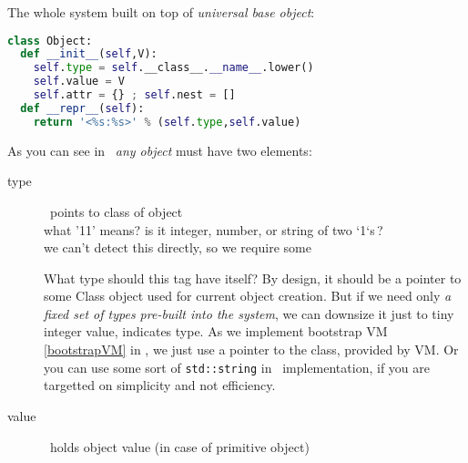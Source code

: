 \label{Object}\secdown

The whole system built on top of \emph{universal base object}: 

\begin{lstlisting}[language=Python]
class Object:
  def __init__(self,V):
    self.type = self.__class__.__name__.lower()
    self.value = V
    self.attr = {} ; self.nest = []
  def __repr__(self):
    return '<%s:%s>' % (self.type,self.value)
\end{lstlisting}

\noindent
As you can see in \cite{budd}\ \emph{any object} must have two elements:
\begin{description}%
\item[type]\ points to class of object\\
what '11' means? is it integer, number, or string of two `1`s\,?\\
we can't detect this directly, so we require some 

What type should this tag have itself? By design, it should be a pointer to some
Class object used for current object creation. But if we need only \emph{a fixed
set of types pre-built into the system}, we can downsize it just to tiny integer
value, indicates type. As we implement bootstrap VM \ref{bootstrapVM} in \py, we
just use a pointer to the class, provided by \py VM. Or you can use
some sort of \verb|std::string| in \cpp\ implementation, if you are targetted on
simplicity and not efficiency.

\item[value]\ holds object value (in case of primitive object)
\end{description}

\secup